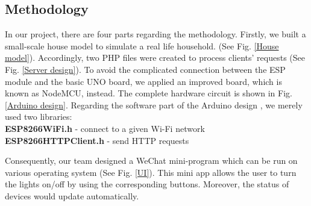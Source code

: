 \documentclass[a0,portrait]{a0poster}
\begin{document}
\begin{multicols}{2}
\color{DarkSlateGray} %

\setcounter{secnumdepth}{2}
\section*{Methodology}
\Large
In our project, there are four parts regarding the methodology. Firstly, we built a small-scale house model to simulate a real life household. (See Fig. \ref{House model}). Accordingly, two PHP files were created to process clients' requests (See Fig. \ref{Server design}). To avoid the complicated connection between the ESP module and the basic UNO board, we applied an improved board, which is known as NodeMCU, instead. The complete hardware circuit is shown in Fig. \ref{Arduino design}. Regarding the software part of the Arduino design , we merely used two libraries: \\
\textbf{ESP8266WiFi.h} - connect to a given Wi-Fi network \\
\textbf{ESP8266HTTPClient.h} - send HTTP requests\vspace{0.5em}

\noindent Consequently, our team designed a WeChat mini-program which can be run on various operating system (See Fig. \ref{UI}). This mini app allows the user to turn the lights on/off by using the corresponding buttons. Moreover, the status of devices would update automatically.

\begin{center}
	\begin{figure}[H]
		\begin{tabular}{cc}
			

\end{tabular}
\end{figure}
\end{center}
\end{multicols}
\end{document}
